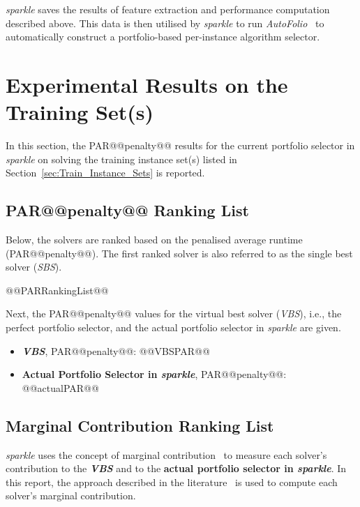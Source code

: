 \documentclass[british]{article}
\begin{document}
\emph{sparkle} saves the results of feature extraction and performance computation described above. This data is then utilised by \emph{sparkle} to run \emph{AutoFolio}~\cite{LinEtAl15} to automatically construct a portfolio-based per-instance algorithm selector.

\section{Experimental Results on the Training Set(s)}
\label{sec:Experimental_Results_Train}

In this section, the PAR@@penalty@@ results for the current portfolio selector in \emph{sparkle} on solving the training instance set(s) listed in Section~\ref{sec:Train_Instance_Sets} is reported.

\subsection{PAR@@penalty@@ Ranking List}
\label{sec:PAR_Ranking}

Below, the solvers are ranked based on the penalised average runtime (PAR@@penalty@@). The first ranked solver is also referred to as the single best solver (\emph{SBS}).

\begin{enumerate}
@@PARRankingList@@
\end{enumerate}

Next, the PAR@@penalty@@ values for the virtual best solver (\emph{VBS}), i.e., the perfect portfolio selector, and the actual portfolio selector in \emph{sparkle} are given.

\begin{itemize}
\item \textbf{\emph{VBS}}, PAR@@penalty@@: @@VBSPAR@@
\item \textbf{Actual Portfolio Selector in \emph{sparkle}}, PAR@@penalty@@: @@actualPAR@@
\end{itemize}

\subsection{Marginal Contribution Ranking List}
\label{sec:Marginal_Contribution_Ranking}

\emph{sparkle} uses the concept of marginal contribution~\cite{XuEtAl12} to measure each solver's contribution to the \textbf{\emph{VBS}} and to the \textbf{actual portfolio selector in \emph{sparkle}}. In this report, the approach described in the literature~\cite{FreEtAl16} is used to compute each solver's marginal contribution.
\end{document}
